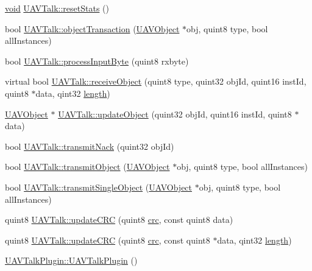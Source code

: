 \begin{DoxyCompactItemize}
\hyperlink{group___u_a_v_objects_plugin_ga444cf2ff3f0ecbe028adce838d373f5c}{void} \hyperlink{group___u_a_v_talk_plugin_gaba16247e0963a29b16a6177e685f1321}{\-U\-A\-V\-Talk\-::reset\-Stats} ()
\item 
bool \hyperlink{group___u_a_v_talk_plugin_gaf41ae2b1b8730f18bc3992d6777c0627}{\-U\-A\-V\-Talk\-::object\-Transaction} (\hyperlink{class_u_a_v_object}{\-U\-A\-V\-Object} $\ast$obj, quint8 type, bool all\-Instances)
\item 
bool \hyperlink{group___u_a_v_talk_plugin_ga39bcb007900ed377097079d21ffe3a68}{\-U\-A\-V\-Talk\-::process\-Input\-Byte} (quint8 rxbyte)
\item 
virtual bool \hyperlink{group___u_a_v_talk_plugin_gaa95319b62b2b1a92e3f0ef753a1c04a3}{\-U\-A\-V\-Talk\-::receive\-Object} (quint8 type, quint32 obj\-Id, quint16 inst\-Id, quint8 $\ast$data, qint32 \hyperlink{uavobjecttemplate_8m_a076bf56c9bafa07f3dbda4901a40d84c}{length})
\item 
\hyperlink{class_u_a_v_object}{\-U\-A\-V\-Object} $\ast$ \hyperlink{group___u_a_v_talk_plugin_ga06d53e41c45734baa38c0eb08d684af8}{\-U\-A\-V\-Talk\-::update\-Object} (quint32 obj\-Id, quint16 inst\-Id, quint8 $\ast$data)
\item 
bool \hyperlink{group___u_a_v_talk_plugin_ga1ea574fb7b47dc949201d4c29b834208}{\-U\-A\-V\-Talk\-::transmit\-Nack} (quint32 obj\-Id)
\item 
bool \hyperlink{group___u_a_v_talk_plugin_ga81519c2c45745383850ccec92be1eb6a}{\-U\-A\-V\-Talk\-::transmit\-Object} (\hyperlink{class_u_a_v_object}{\-U\-A\-V\-Object} $\ast$obj, quint8 type, bool all\-Instances)
\item 
bool \hyperlink{group___u_a_v_talk_plugin_ga474ec2f43670acca29d18ad9965b0440}{\-U\-A\-V\-Talk\-::transmit\-Single\-Object} (\hyperlink{class_u_a_v_object}{\-U\-A\-V\-Object} $\ast$obj, quint8 type, bool all\-Instances)
\item 
quint8 \hyperlink{group___u_a_v_talk_plugin_gae15db61cd3e3604aad8fbd52ddc68fff}{\-U\-A\-V\-Talk\-::update\-C\-R\-C} (quint8 \hyperlink{uavobjecttemplate_8m_a6a3730e10b2455e9a8b6599785809fce}{crc}, const quint8 data)
\item 
quint8 \hyperlink{group___u_a_v_talk_plugin_gadefd185fb8609e37990694d45282ecd4}{\-U\-A\-V\-Talk\-::update\-C\-R\-C} (quint8 \hyperlink{uavobjecttemplate_8m_a6a3730e10b2455e9a8b6599785809fce}{crc}, const quint8 $\ast$data, qint32 \hyperlink{uavobjecttemplate_8m_a076bf56c9bafa07f3dbda4901a40d84c}{length})
\item 
\hyperlink{group___u_a_v_talk_plugin_ga140bdf803c218ccb2a6017a2a6aba95e}{\-U\-A\-V\-Talk\-Plugin\-::\-U\-A\-V\-Talk\-Plugin} ()

\end{DoxyCompactItemize}
